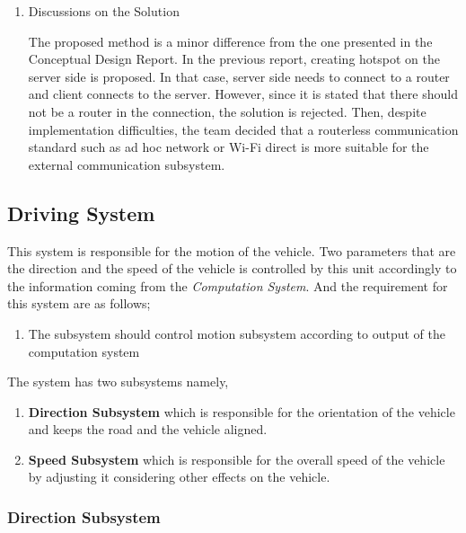 \documentclass[a4paper,12pt]{article}
\begin{document}
\begin{enumerate}
			
			\item {Discussions on the Solution}
			
			The proposed method is a minor difference from the one presented in the Conceptual Design Report. In the previous report, creating hotspot on the server side is proposed. In that case, server side needs to connect to a router and client connects to the server. However, since it is stated that there should not be a router in the connection, the solution is rejected. Then, despite implementation difficulties, the team decided that a routerless communication standard such as ad hoc network or Wi-Fi direct is more suitable for the external communication subsystem. 
		\end{enumerate}
	
	
	
	\subsection{Driving System}
	
	This system is responsible for the motion of the vehicle. Two parameters that are the direction and the speed of the vehicle is controlled by this unit accordingly to the information coming from the \textit{Computation System}. And the requirement for this system are as follows;
		
		\begin{enumerate}
			\item The subsystem should control motion subsystem according to output of the computation system			
		\end{enumerate}
		
		
		The system has two subsystems namely,
		
			\begin{enumerate}
				\item \textbf{Direction Subsystem} which is responsible for the orientation of the vehicle and keeps the road and the vehicle aligned.
				\item \textbf{Speed Subsystem} which is responsible for the overall speed of the vehicle by adjusting it considering other effects on the vehicle.
			\end{enumerate}
			
	\subsubsection{Direction Subsystem}
		
\end{document}
